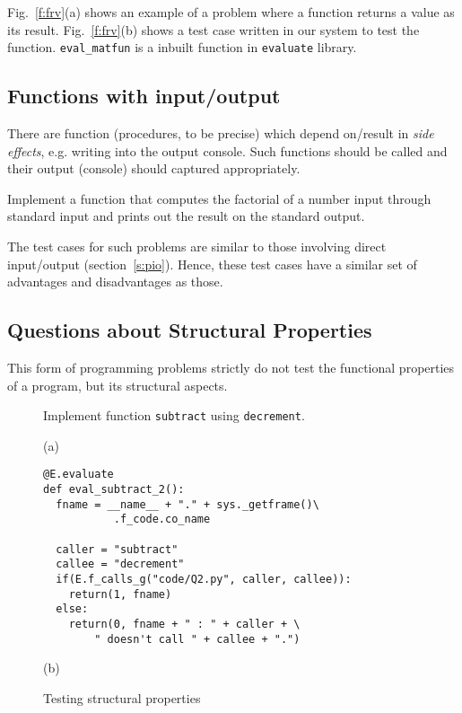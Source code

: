 \documentclass[sigconf]{acmart}
\begin{document}
Fig.~\ref{f:frv}(a) shows an example of a problem where a function returns a value as its result. Fig.~\ref{f:frv}(b) shows a test case written in our system to test the function. \lstinline[style=pc]|eval_matfun| is a inbuilt function in \lstinline[style=pc]|evaluate| library.
\subsection{Functions with input/output}
There are function (procedures, to be precise) which depend on/result in \emph{side effects}, e.g. writing into the output console. Such functions should be called and their output (console) should captured appropriately.


\begin{mdframed}[frametitle=Example]
Implement a function that computes the factorial of a number input through standard input and prints out the result on the standard output.
\end{mdframed}

The test cases for such problems are similar to those involving direct input/output (section~\ref*{s:pio}). Hence, these test cases have a similar set of advantages and disadvantages as those. 

\subsection{Questions about Structural Properties}
This form of programming problems strictly do not test the functional properties of a program, but its structural aspects.

\begin{figure}
\begin{mdframed}[frametitle=Example]
Implement function \lstinline[style=pc]@subtract@ using \lstinline[style=pc]@decrement@.
\end{mdframed}

(a)

\begin{lstlisting}[style=pc]
@E.evaluate
def eval_subtract_2():
  fname = __name__ + "." + sys._getframe()\
           .f_code.co_name

  caller = "subtract"
  callee = "decrement"
  if(E.f_calls_g("code/Q2.py", caller, callee)):
    return(1, fname)
  else:
    return(0, fname + " : " + caller + \
        " doesn't call " + callee + ".")
\end{lstlisting}

(b)
\caption{Testing structural properties}
\label{f:ps}
\end{figure}
\end{document}
